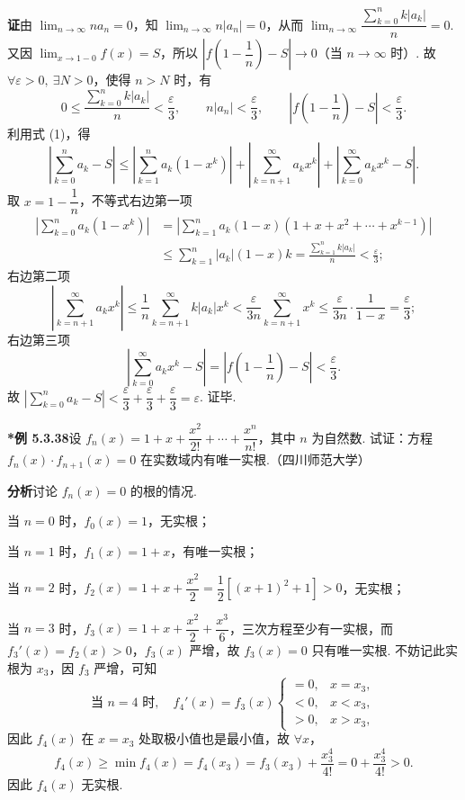 \documentclass[UTF8, 12pt, fontset=fandol, oneside]{ctexart}
\begin{document}
\noindent\textbf{证}\quad 由 $\displaystyle\lim_{n\to\infty}na_n=0$，知
$\displaystyle\lim_{n\to\infty}n|a_n|=0$，从而
$\displaystyle\lim_{n\to\infty}\dfrac{\sum_{k=0}^n k|a_k|}{n}=0$. 又因
$\displaystyle\lim_{x\to1-0}f(x)=S$，所以
$\left|f\left(1-\dfrac1n\right)-S\right|\to0$（当 $n\to\infty$ 时）. 故
$\forall\varepsilon>0,\ \exists N>0$，使得 $n>N$ 时，有
\[
  0\le\frac{\sum_{k=0}^n k|a_k|}{n}<\frac\varepsilon3,\qquad
  n|a_n|<\frac\varepsilon3,\qquad
  \left|f\left(1-\frac1n\right)-S\right|<\frac\varepsilon3.
\]
利用式 (1)，得
\[
  \left|\sum_{k=0}^n a_k-S\right|
  \le\left|\sum_{k=1}^n a_k(1-x^k)\right|
  +\left|\sum_{k=n+1}^{\infty}a_kx^k\right|
  +\left|\sum_{k=0}^{\infty}a_kx^k-S\right|.
\]
取 $x=1-\dfrac1n$，不等式右边第一项
\[
\begin{aligned}
\left|\sum_{k=0}^n a_k(1-x^k)\right|
&=\left|\sum_{k=1}^n a_k(1-x)(1+x+x^2+\cdots+x^{k-1})\right|\\
&\le\sum_{k=1}^n |a_k|(1-x)k
=\frac{\sum_{k=1}^n k|a_k|}{n}<\frac\varepsilon3;
\end{aligned}
\]
右边第二项
\[
  \left|\sum_{k=n+1}^{\infty}a_kx^k\right|
  \le\frac1n\sum_{k=n+1}^{\infty}k|a_k|x^k
  <\frac\varepsilon{3n}\sum_{k=n+1}^{\infty}x^k
  \le\frac\varepsilon{3n}\cdot\frac1{1-x}
  =\frac\varepsilon3;
\]
右边第三项
\[
  \left|\sum_{k=0}^{\infty}a_kx^k-S\right|
  =\left|f\left(1-\frac1n\right)-S\right|<\frac\varepsilon3.
\]
故 $\left|\displaystyle\sum_{k=0}^n a_k-S\right|<\dfrac\varepsilon3+\dfrac\varepsilon3+\dfrac\varepsilon3=\varepsilon$. 证毕.

\noindent\textbf{*例 5.3.38}\quad 设
$f_n(x)=1+x+\dfrac{x^2}{2!}+\cdots+\dfrac{x^n}{n!}$，其中 $n$ 为自然数. 试证：方程
$f_n(x)\cdot f_{n+1}(x)=0$ 在实数域内有唯一实根.（四川师范大学）

\noindent\textbf{分析}\quad 讨论 $f_n(x)=0$ 的根的情况.

当 $n=0$ 时，$f_0(x)=1$，无实根；

当 $n=1$ 时，$f_1(x)=1+x$，有唯一实根；

当 $n=2$ 时，$f_2(x)=1+x+\dfrac{x^2}{2}=\dfrac12[(x+1)^2+1]>0$，无实根；

当 $n=3$ 时，$f_3(x)=1+x+\dfrac{x^2}{2}+\dfrac{x^3}{6}$，三次方程至少有一实根，而
$f_3'(x)=f_2(x)>0$，$f_3(x)$ 严增，故 $f_3(x)=0$ 只有唯一实根. 不妨记此实根为 $x_3$，因 $f_3$ 严增，可知
\[
  \text{当 }n=4\text{ 时},\quad
  f_4'(x)=f_3(x)
  \begin{cases}
    =0,&x=x_3,\\
    <0,&x<x_3,\\
    >0,&x>x_3,
  \end{cases}
\]
因此 $f_4(x)$ 在 $x=x_3$ 处取极小值也是最小值，故 $\forall x$，
\[
  f_4(x)\ge\min f_4(x)=f_4(x_3)=f_3(x_3)+\frac{x_3^4}{4!}=0+\frac{x_3^4}{4!}>0.
\]
因此 $f_4(x)$ 无实根.
\end{document}
